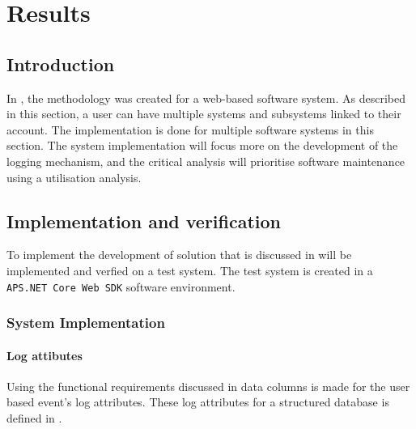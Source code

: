 \chapter{Results}
\label{chap:3}

\section{Introduction}
In , the methodology was created for a web-based software system. As described in this section, a user can have multiple systems and subsystems linked to their account. The implementation is done for multiple software systems in this section. The system implementation will focus more on the development of the logging mechanism, and the critical analysis will prioritise software maintenance using a utilisation analysis.

\section{Implementation and verification}
To implement the development of solution that is discussed in  will be implemented and verfied on a test system. The test system is created in a \texttt{APS.NET Core Web SDK} software environment. 

\subsection{System Implementation}

\subsubsection{Log attibutes}\label{sec:ch3_logAtrributes}
Using the functional requirements discussed in  data columns is made for the user based event's log attributes. These log attributes for a structured database is defined in . 

